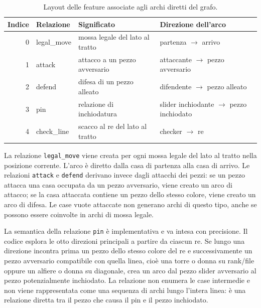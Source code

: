 \begin{table}[htbp]
    \centering
    \small
    \begin{tabularx}{\textwidth}{r>{\raggedright\arraybackslash}p{}>{\raggedright\arraybackslash}X>{\raggedright\arraybackslash}p{}}
        \hline
        Indice & Relazione & Significato & Direzione dell'arco \\
        \hline
        0 & legal\_move & mossa legale del lato al tratto & partenza \(\rightarrow\) arrivo \\
        1 & attack & attacco a un pezzo avversario & attaccante \(\rightarrow\) pezzo avversario \\
        2 & defend & difesa di un pezzo alleato & difendente \(\rightarrow\) pezzo alleato \\
        3 & pin & relazione di inchiodatura & slider inchiodante \(\rightarrow\) pezzo inchiodato \\
        4 & check\_line & scacco al re del lato al tratto & checker \(\rightarrow\) re \\
        \hline
    \end{tabularx}
    \caption{Layout delle feature associate agli archi diretti del grafo.}
    \label{tab:main-edge-features}
\end{table}

La relazione \texttt{legal\_move} viene creata per ogni mossa legale del lato al tratto nella posizione corrente. L'arco \`e diretto dalla casa di partenza alla casa di arrivo. Le relazioni \texttt{attack} e \texttt{defend} derivano invece dagli attacchi dei pezzi: se un pezzo attacca una casa occupata da un pezzo avversario, viene creato un arco di attacco; se la casa attaccata contiene un pezzo dello stesso colore, viene creato un arco di difesa. Le case vuote attaccate non generano archi di questo tipo, anche se possono essere coinvolte in archi di mossa legale.

La semantica della relazione \texttt{pin} \`e implementativa e va intesa con precisione. Il codice esplora le otto direzioni principali a partire da ciascun re. Se lungo una direzione incontra prima un pezzo dello stesso colore del re e successivamente un pezzo avversario compatibile con quella linea, cio\`e una torre o donna su rank/file oppure un alfiere o donna su diagonale, crea un arco dal pezzo slider avversario al pezzo potenzialmente inchiodato. La relazione non enumera le case intermedie e non viene rappresentata come una sequenza di archi lungo l'intera linea: \`e una relazione diretta tra il pezzo che causa il pin e il pezzo inchiodato.


